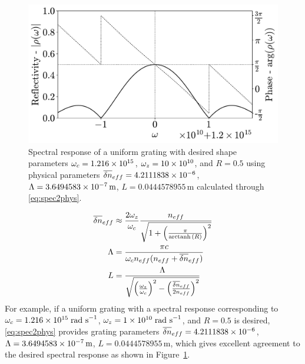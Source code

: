 %
\begin{figure}
    \centering
    
    \includegraphics[width=0.65\linewidth]{Images/Introduction/spec2phys.pdf}
    
    \caption{Spectral response of a uniform grating with desired shape parameters $\omega_c = 1.216\times 10^{15}$, $\omega_z = 10\times 10^{10}$, and $R = 0.5$ using physical parameters $\overline{\delta n}_{eff}= 4.2111838\times 10^{-6}$, $\Lambda = 3.6494583\times 10^{-7}\,\text{m}$, $L = 0.0444578955\,\text{m}$  calculated through \eqref{eq:spec2phys}.}
    
    \label{fig:spec2phys}
\end{figure}
%
\begin{align}
\label{eq:spec2phys}
    \overline{\delta n}_{eff} &\approx \frac{2\omega_z}{\omega_c} \frac{n_{eff}}{\sqrt{1 + \left(\frac{\pi}{\operatorname{arctanh}{(R)}} \right)^2}}
    \\
    \Lambda &= \frac{\pi c}{\omega_c n_{eff} (n_{eff} +\overline{\delta n}_{eff})}
    \\
    L &= \frac{\Lambda}{\sqrt{\left( \frac{\omega_z}{\omega_c} \right)^2 - \left( \frac{\overline{\delta n}_{eff}}{2n_{eff}} \right)^2}}
\end{align}
%
For example, if a uniform grating with a spectral response corresponding to $\omega_c = 1.216\times 10^{15}\; \text{rad s}^{-1}$, $\omega_z = 1\times 10^{10}\; \text{rad s}^{-1}$, and $R = 0.5$ is desired, \eqref{eq:spec2phys} provides grating parameters $\overline{\delta n}_{eff}= 4.2111838\times 10^{-6}$, $\Lambda = 3.6494583\times 10^{-7}\,\text{m}$, $L = 0.0444578955\,\text{m}$, which gives excellent agreement to the desired spectral response as shown in Figure~\ref{fig:spec2phys}. 
%
%
